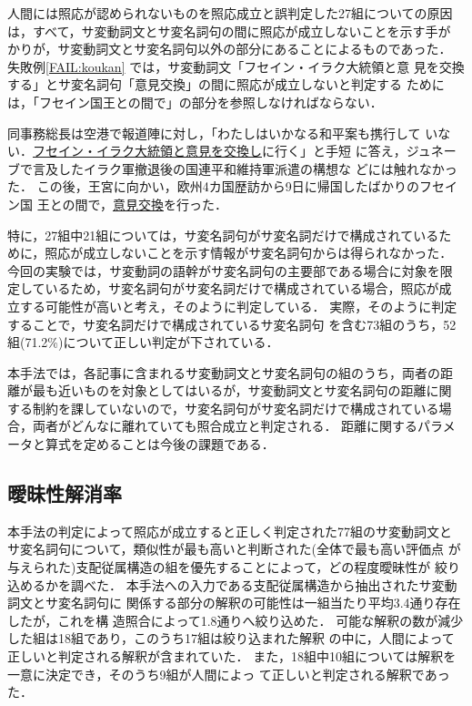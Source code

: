 人間には照応が認められないものを照応成立と誤判定した27組についての原因
は，すべて，サ変動詞文とサ変名詞句の間に照応が成立しないことを示す手が
かりが，サ変動詞文とサ変名詞句以外の部分にあることによるものであった．
失敗例\ref{FAIL:koukan} では，サ変動詞文「フセイン・イラク大統領と意
見を交換する」とサ変名詞句「意見交換」の間に照応が成立しないと判定する
ためには，「フセイン国王との間で」の部分を参照しなければならない． 
\begin{FAIL}
\fail 
同事務総長は空港で報道陣に対し，「わたしはいかなる和平案も携行して
いない．\underline{フセイン・イラク大統領と意見を交換し}に行く」と手短
に答え，ジュネーブで言及したイラク軍撤退後の国連平和維持軍派遣の構想な
どには触れなかった．
この後，王宮に向かい，欧州4カ国歴訪から9日に帰国したばかりのフセイン国
王との間で，\underline{意見交換}を行った．\label{FAIL:koukan}
\end{FAIL}
特に，27組中21組については，サ変名詞句がサ変名詞だけで構成されているた
めに，照応が成立しないことを示す情報がサ変名詞句からは得られなかった．
今回の実験では，サ変動詞の語幹がサ変名詞句の主要部である場合に対象を限
定しているため，サ変名詞句がサ変名詞だけで構成されている場合，照応が成
立する可能性が高いと考え，そのように判定している．
実際，そのように判定することで，サ変名詞だけで構成されているサ変名詞句
を含む73組のうち，52組(71.2\%)について正しい判定が下されている．

本手法では，各記事に含まれるサ変動詞文とサ変名詞句の組のうち，両者の距
離が最も近いものを対象としてはいるが，サ変動詞文とサ変名詞句の距離に関
する制約を課していないので，サ変名詞句がサ変名詞だけで構成されている場
合，両者がどんなに離れていても照合成立と判定される．
距離に関するパラメータと算式を定めることは今後の課題である．

\subsection{曖昧性解消率}

本手法の判定によって照応が成立すると正しく判定された77組のサ変動詞文と
サ変名詞句について，類似性が最も高いと判断された(全体で最も高い評価点
が与えられた)支配従属構造の組を優先することによって，どの程度曖昧性が
絞り込めるかを調べた．
本手法への入力である支配従属構造から抽出されたサ変動詞文とサ変名詞句に
関係する部分の解釈の可能性は一組当たり平均3.4通り存在したが，これを構
造照合によって1.8通りへ絞り込めた．
可能な解釈の数が減少した組は18組であり，このうち17組は絞り込まれた解釈
の中に，人間によって正しいと判定される解釈が含まれていた．
また，18組中10組については解釈を一意に決定でき，そのうち9組が人間によっ
て正しいと判定される解釈であった．

